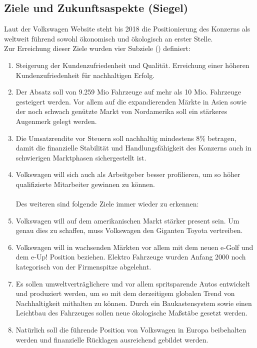 \documentclass[12pt]{article}
\begin{document}
\subsection{Ziele und Zukunftsaspekte (Siegel)}
Laut der Volkswagen Website steht bis 2018 die Positionierung des Konzerns als weltweit führend sowohl ökonomisch und ökologisch an erster Stelle.\\
Zur Erreichung dieser Ziele wurden vier Subziele (\cite{vwwebsitestrat}) definiert:
\begin{enumerate}
\item Steigerung der Kundenzufriedenheit und Qualität. Erreichung einer höheren Kundenzufriedenheit für nachhaltigen Erfolg.
\item Der Absatz soll von 9.259 Mio Fahrzeuge auf mehr als 10 Mio. Fahrzeuge gesteigert werden.  Vor allem auf die expandierenden Märkte in Asien sowie der noch schwach genützte Markt von Nordamerika soll ein stärkeres Augenmerk gelegt werden.
\item Die Umsatzrendite vor Steuern soll nachhaltig mindestens 8\% betragen, damit die finanzielle Stabilität und Handlungsfähigkeit des Konzerns auch in schwierigen Marktphasen sichergestellt ist. 
\item Volkswagen will sich auch als Arbeitgeber besser profilieren, um so höher qualifizierte Mitarbeiter gewinnen zu können.  \\\\
Des weiteren sind folgende Ziele immer wieder zu erkennen: \\
\item Volkswagen will auf dem amerikanischen Markt stärker present sein. Um genau dies zu schaffen, muss Volkswagen den Giganten Toyota vertreiben. \cite{ec1}
\item Volkswagen will in wachsenden Märkten vor allem mit dem neuen e-Golf und dem e-Up! Position beziehen. Elektro Fahrzeuge wurden Anfang 2000 noch kategorisch von der Firmenspitze abgelehnt. \cite{ec3} 
\item Es sollen umweltverträglichere und vor allem spritsparende Autos entwickelt und produziert werden, um so mit dem derzeitigem globalen Trend von Nachhaltigkeit mithalten zu können. Durch ein Baukastensystem sowie einen Leichtbau des Fahrzeuges sollen neue ökologische Maßstäbe gesetzt werden.
\item Natürlich soll die führende Position von Volkswagen in Europa beibehalten werden und finanzielle Rücklagen ausreichend gebildet werden.
\end{enumerate}
\newpage
\end{document}
